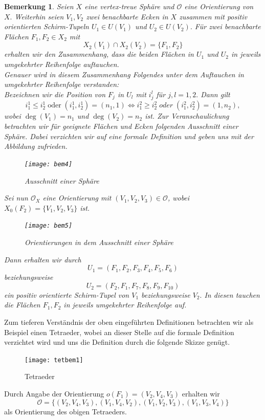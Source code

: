 \documentclass[12pt,titlepage,twoside,cleardoublepage]{article}
\theoremstyle{nummermitklammern}
\newtheorem{bemerkung}[temp]{Bemerkung}
\newtheorem{bemerkung}[zahl]{Bemerkung}
\numberwithin{equation}{section}
\begin{document}
\begin{bemerkung}\label{pos}
Seien $X$ eine vertex-treue Sphäre und $\mathcal{O}$ eine Orientierung von $X.$ Weiterhin seien $V_1,V_2$ zwei benachbarte Ecken in $X$ zusammen mit positiv orientierten Schirm-Tupeln $U_1\in U(V_1)$ und $U_2\in U(V_2).$ Für zwei benachbarte Flächen $F_1,F_2\in X_2$ mit 
\[
X_2(V_1)\cap X_2(V_2)=\{F_1,F_2\}
\]
erhalten wir den Zusammenhang, dass die beiden Flächen in $U_1$ und $U_2$ in jeweils umgekehrter Reihenfolge auftauchen.\\
Genauer wird in diesem Zusammenhang Folgendes unter dem Auftauchen in umgekehrter Reihenfolge verstanden:\\ 
Bezeichnen wir die Position von $F_j$ in $U_l$ mit $i_j^l$ für $j,l=1,2.$ Dann gilt
\[
i^1_1\leq i_2^1 \; \text{oder} \; (i_1^1,i^1_2)=(n_1,1)\Leftrightarrow i^2_1\geq i_2^2 \; oder \; (i_1^2,i^2_2)=(1,n_2),
\]
wobei $\deg(V_1)=n_1$ und $\deg(V_2)=n_2$ ist.
Zur Veranschaulichung betrachten wir für geeignete Flächen und Ecken folgenden Ausschnitt einer Sphäre. Dabei verzichten wir auf eine formale Definition und geben uns mit der Abbildung zufrieden. 
\begin{figure}[H]
\begin{center}
\texttt{[image: bem4]}
\end{center}
\caption{Ausschnitt einer Sphäre}
\end{figure}
Sei nun $\mathcal{O}_X$ eine Orientierung mit $(V_1,V_2,V_3)\in \mathcal{O}$, wobei $X_0(F_2)=\{V_1,V_2,V_3\}$ ist.
\begin{figure}[H]
\begin{center}
\texttt{[image: bem5]}
\end{center}
\caption{Orientierungen in dem Ausschnitt einer Sphäre}
\end{figure}

Dann erhalten wir durch 
\[
U_1=(F_1,F_2,F_3,F_4,F_5,F_6)
\]
beziehungsweise
\[
U_2=(F_2,F_1,F_7,F_8,F_9,F_{10})
\]
ein positiv orientierte Schirm-Tupel von $V_1$ beziehungsweise $V_2.$ In diesen tauchen die Flächen $F_1,F_2$ in jeweils umgekehrter Reihenfolge auf. 
\end{bemerkung}
Zum tieferen Verständnis der oben eingeführten Definitionen betrachten wir als Beispiel einen Tetraeder, wobei an dieser Stelle auf die formale Definition verzichtet wird und uns die Definition durch die folgende Skizze genügt.
\begin{figure}[H]
\begin{center}
\texttt{[image: tetbem1]}
\end{center}
\caption{Tetraeder}
\end{figure} 
Durch Angabe der Orientierung $o(F_1)=(V_2,V_4,V_3)$ erhalten wir
\[
\mathcal{O}=\{(V_2,V_4,V_3),(V_1,V_4,V_2),(V_1,V_2,V_3),(V_1,V_3,V_4)\}
\] 
als Orientierung des obigen Tetraeders.
 
\end{document}
